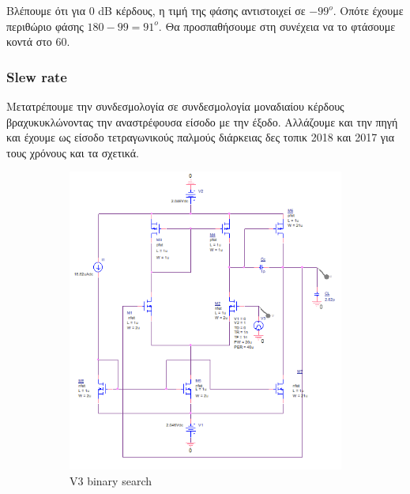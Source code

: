 \documentclass[12pt, a4paper]{article}
\begin{document}
Βλέπουμε ότι για 0 dB κέρδους, η τιμή της φάσης αντιστοιχεί σε $-99^o$. Οπότε έχουμε περιθώριο φάσης $180 - 99 = 91^ο$. Θα προσπαθήσουμε στη συνέχεια να το φτάσουμε κοντά στο 60. 

\subsubsection{Slew rate}

Μετατρέπουμε την συνδεσμολογία σε συνδεσμολογία μοναδιαίου κέρδους βραχυκυκλώνοντας την αναστρέφουσα είσοδο με την έξοδο. Αλλάζουμε και την πηγή και έχουμε ως είσοδο τετραγωνικούς παλμούς διάρκειας δες τοπικ 2018 και 2017 για τους χρόνους και τα σχετικά.



\begin{figure}[h!]
     \begin{subfigure}[b]{0.5\textwidth}
         \centering
         \includegraphics[height=.4\textheight, width=\textwidth, keepaspectratio]{assets/slew_rate_circuit.png}
    \caption{V3 binary search}
     \end{subfigure}
     \begin{subfigure}[b]{0.5\textwidth}
         \centering

\end{subfigure}
\end{figure}
\end{document}
